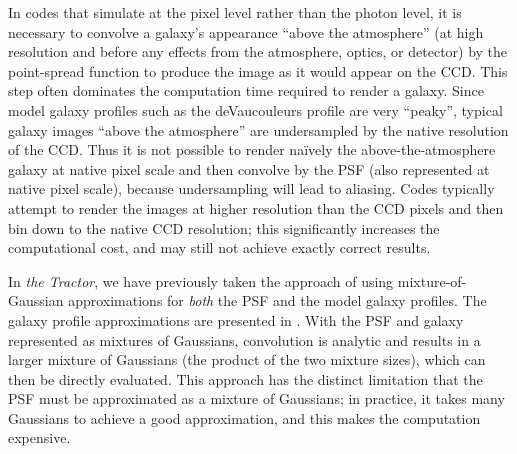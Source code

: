 \documentclass[11pt,preprint]{aastex}
\newcommand{\project}[1]{\textsl{#1}}
\begin{document}

In codes that simulate at the pixel level rather than the photon
level, it is necessary to convolve a galaxy's appearance ``above the
atmosphere'' (at high resolution and before any effects from the
atmosphere, optics, or detector) by the point-spread function to
produce the image as it would appear on the CCD.  This step often
dominates the computation time required to render a galaxy.  Since
model galaxy profiles such as the deVaucouleurs profile are very
``peaky'', typical galaxy images ``above the atmosphere'' are
undersampled by the native resolution of the CCD.  Thus it is not
possible to render na\"ively the above-the-atmosphere galaxy at native
pixel scale and then convolve by the PSF (also represented at native
pixel scale), because undersampling will lead to aliasing.  Codes
typically attempt to render the images at higher resolution than the
CCD pixels and then bin down to the native CCD resolution; this
significantly increases the computational cost, and may still not
achieve exactly correct results.

In \project{the Tractor}, we have previously taken the approach of
using mixture-of-Gaussian approximations for \emph{both} the PSF and
the model galaxy profiles.  The galaxy profile approximations are
presented in \cite{moggalaxy}.  With the PSF and galaxy represented as
mixtures of Gaussians, convolution is analytic and results in a larger
mixture of Gaussians (the product of the two mixture sizes), which can
then be directly evaluated.  This approach has the distinct limitation
that the PSF must be approximated as a mixture of Gaussians; in
practice, it takes many Gaussians to achieve a good approximation, and
this makes the computation expensive.
\end{document}
